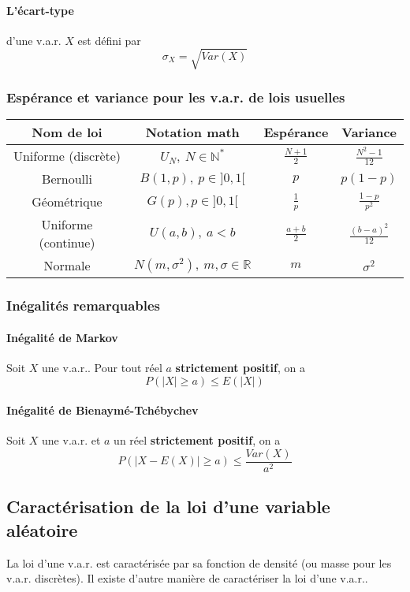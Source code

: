 \documentclass[10pt,a4paper,twoside]{article}
\begin{document}
\paragraph{L'écart-type} d'une v.a.r. $X$ est défini par
$$\sigma_{X} = \sqrt{Var(X)}$$


\subsubsection{Espérance et variance pour les v.a.r. de lois usuelles}

\renewcommand\arraystretch{1.75}
\begin{tabular}{cccc}

Nom de loi & Notation math & Espérance & Variance \\ 
\hline 
Uniforme (discrète) & $U_{N},\ N\in \mathbb{N^{*}}$ & $\frac{N+1}{2}$ & $\frac{N^{2}-1}{12}$ \\ 
Bernoulli & $B(1,p),\ p\in ]0,1[$ & $p$ & $p(1-p)$\\
Géométrique & $G(p), p\in ]0,1[$ & $\frac{1}{p}$ & $\frac{1-p}{p^{2}}$\\
Uniforme (continue) & $U(a,b),\ a<b$ & $\frac{a+b}{2}$ & $\frac{(b-a)^{2}}{12}$\\
Normale & $N(m,\sigma^{2}),\ m,\sigma \in \mathbb{R}$ & $m$ & $\sigma^{2}$
\end{tabular} 
\renewcommand\arraystretch{1}

\subsubsection{Inégalités remarquables}
\paragraph{Inégalité de Markov} Soit $X$ une v.a.r.. Pour tout réel $a$ \textbf{strictement positif}, on a
$$P(|X|\geqslant a) \leqslant E(|X|)$$

\paragraph{Inégalité de Bienaymé-Tchébychev} Soit $X$ une v.a.r. et $a$ un réel \textbf{strictement positif}, on a
$$P(|X-E(X)|\geqslant a) \leqslant \frac{Var(X)}{a^{2}}$$

\subsection{Caractérisation de la loi d'une variable aléatoire}
La loi d'une v.a.r. est caractérisée par sa fonction de densité (ou masse pour les v.a.r. discrètes). Il existe d'autre manière de caractériser la loi d'une v.a.r..
\end{document}
